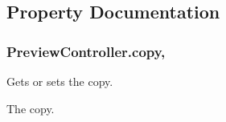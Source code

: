 \subsection{Property Documentation}
\hypertarget{class_preview_controller_a3f44a88dd89aa311b734034de2f70417}{
\subsubsection[{copy}]{ Preview\-Controller.\-copy\hspace{0.3cm}{\ttfamily [get]}, {\ttfamily [set]}}}\label{class_preview_controller_a3f44a88dd89aa311b734034de2f70417}


Gets or sets the copy. 

The copy. 